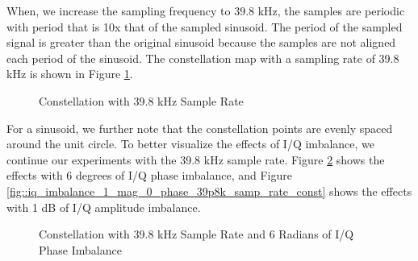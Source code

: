 \documentclass{article}
\begin{document}
When, we increase the sampling frequency to 39.8 kHz, the samples are periodic with period that is 10x that of the sampled sinusoid. The period of the sampled signal is greater than the original sinusoid because the samples are not aligned each period of the sinusoid. The constellation map with a sampling rate of 39.8 kHz is shown in Figure \ref{fig::iq_imbalance_0_mag_0_phase_39p8k_samp_rate_const}.

\begin{figure}[H]
	\centerline{}
	\caption{Constellation with 39.8 kHz Sample Rate}
	\label{fig::iq_imbalance_0_mag_0_phase_39p8k_samp_rate_const}
\end{figure}

For a sinusoid, we further note that the constellation points are evenly spaced around the unit circle. To better visualize the effects of I/Q imbalance, we continue our experiments with the 39.8 kHz sample rate. Figure \ref{fig::iq_imbalance_0_mag_6_phase_39p8k_samp_rate_const} shows the effects with 6 degrees of I/Q phase imbalance, and Figure \ref{fig::iq_imbalance_1_mag_0_phase_39p8k_samp_rate_const} shows the effects with 1 dB of I/Q amplitude imbalance.

\begin{figure}[H]
	\centerline{}
	\caption{Constellation with 39.8 kHz Sample Rate and 6 Radians of I/Q Phase Imbalance}
	\label{fig::iq_imbalance_0_mag_6_phase_39p8k_samp_rate_const}
\end{figure}
\end{document}
